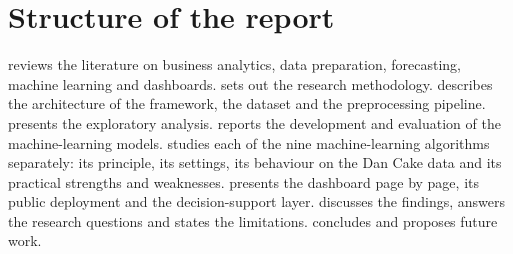 \section{Structure of the report}
 reviews the literature on business analytics, data preparation, forecasting, machine
learning and dashboards.  sets out the research methodology.  describes the
architecture of the framework, the dataset and the preprocessing pipeline.  presents the
exploratory analysis.  reports the development and evaluation of the machine-learning models.
 studies each of the nine machine-learning algorithms separately: its principle, its
settings, its behaviour on the Dan Cake data and its practical strengths and weaknesses. 
presents the dashboard page by page, its public deployment and the decision-support layer.  discusses the
findings, answers the research questions and states the limitations.  concludes and
proposes future work.
